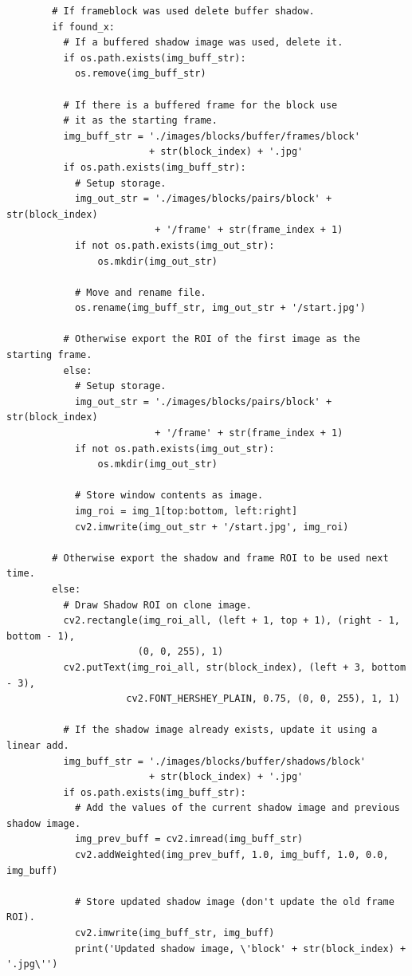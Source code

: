 \documentclass[conference]{IEEEtran}
\begin{document}
{\begin{verbatim}
        # If frameblock was used delete buffer shadow.
        if found_x:
          # If a buffered shadow image was used, delete it.
          if os.path.exists(img_buff_str):
            os.remove(img_buff_str)

          # If there is a buffered frame for the block use
          # it as the starting frame.
          img_buff_str = './images/blocks/buffer/frames/block'
                         + str(block_index) + '.jpg'
          if os.path.exists(img_buff_str):
            # Setup storage.
            img_out_str = './images/blocks/pairs/block' + str(block_index)
                          + '/frame' + str(frame_index + 1)
            if not os.path.exists(img_out_str):
                os.mkdir(img_out_str)

            # Move and rename file.
            os.rename(img_buff_str, img_out_str + '/start.jpg')

          # Otherwise export the ROI of the first image as the starting frame.
          else:
            # Setup storage.
            img_out_str = './images/blocks/pairs/block' + str(block_index)
                          + '/frame' + str(frame_index + 1)
            if not os.path.exists(img_out_str):
                os.mkdir(img_out_str)

            # Store window contents as image.
            img_roi = img_1[top:bottom, left:right]
            cv2.imwrite(img_out_str + '/start.jpg', img_roi)

        # Otherwise export the shadow and frame ROI to be used next time.
        else:
          # Draw Shadow ROI on clone image.
          cv2.rectangle(img_roi_all, (left + 1, top + 1), (right - 1, bottom - 1),
                       (0, 0, 255), 1)
          cv2.putText(img_roi_all, str(block_index), (left + 3, bottom - 3),
                     cv2.FONT_HERSHEY_PLAIN, 0.75, (0, 0, 255), 1, 1)

          # If the shadow image already exists, update it using a linear add.
          img_buff_str = './images/blocks/buffer/shadows/block'
                         + str(block_index) + '.jpg'
          if os.path.exists(img_buff_str):
            # Add the values of the current shadow image and previous shadow image.
            img_prev_buff = cv2.imread(img_buff_str)
            cv2.addWeighted(img_prev_buff, 1.0, img_buff, 1.0, 0.0, img_buff)

            # Store updated shadow image (don't update the old frame ROI).
            cv2.imwrite(img_buff_str, img_buff)
            print('Updated shadow image, \'block' + str(block_index) + '.jpg\'')


\end{verbatim}}
\end{document}
